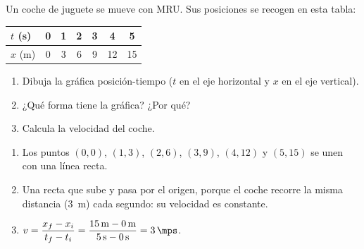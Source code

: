 \begin{exercise}
    Un coche de juguete se mueve con MRU. Sus posiciones se recogen en esta tabla:
    \begin{center}
        \begin{tabular}{lcccccc}
            \toprule
            \(t\) (s) & 0 & 1 & 2 & 3 & 4 & 5 \\
            \midrule
            \(x\) (m) & 0 & 3 & 6 & 9 & 12 & 15 \\
            \bottomrule
        \end{tabular}
    \end{center}
    \begin{enumerate}[label=\letraminuscula]
        \item Dibuja la gráfica posición-tiempo (\(t\) en el eje horizontal y \(x\) en el eje vertical).
        \item ¿Qué forma tiene la gráfica? ¿Por qué?
        \item Calcula la velocidad del coche.
    \end{enumerate}
    \begin{solu}
        \begin{enumerate}[label=\alph*)]
            \item Los puntos \((0,0)\), \((1,3)\), \((2,6)\), \((3,9)\), \((4,12)\) y \((5,15)\) se unen con una línea recta.
    \begin{center}
            \end{center}
            \item Una recta que sube y pasa por el origen, porque el coche recorre la misma distancia (\qty{3}{\m}) cada segundo: su velocidad es constante.
            \item \(v = \dfrac{x_f - x_i}{t_f - t_i} = \dfrac{\qty{15}{\m} - \qty{0}{\m}}{\qty{5}{\s} - \qty{0}{\s}} = \qty{3}{\mps}\).
        \end{enumerate}
    \end{solu}
\end{exercise}

